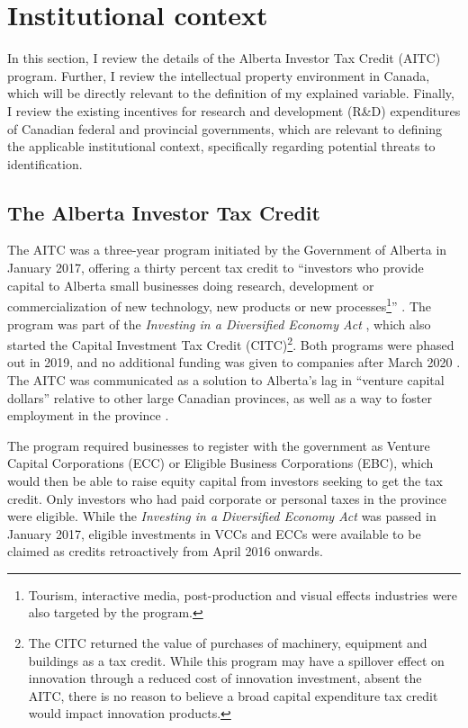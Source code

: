 \documentclass[../main.tex]{subfiles}
\begin{document}
\section{Institutional context}
\label{sec:institutional_background}

In this section, I review the details of the Alberta Investor Tax Credit (AITC) program. Further, I review the intellectual property environment in Canada, which will be directly relevant to the definition of my explained variable. Finally, I review the existing incentives for research and development (R\&D) expenditures of Canadian federal and provincial governments, which are relevant to defining the applicable institutional context, specifically regarding potential threats to identification.

\subsection{The Alberta Investor Tax Credit}

The AITC was a three-year program initiated by the Government of Alberta in January 2017, offering a thirty percent tax credit to \enquote{investors who provide capital to Alberta small businesses doing research, development or commercialization of new technology, new products or new processes\footnote{Tourism, interactive media, post-production and visual effects industries were also targeted by the program.}} \parencite[p.1]{albertaeconomicdevelopmentandtrade17}. The program was part of the \textit{Investing in a Diversified Economy Act} \nocite{Investing16}, which also started the Capital Investment Tax Credit (CITC)\footnote{The CITC returned the value of purchases of machinery, equipment and buildings as a tax credit. While this program may have a spillover effect on innovation through a reduced cost of innovation investment, absent the AITC, there is no reason to believe a broad capital expenditure tax credit would impact innovation products.}. Both programs were phased out in 2019, and no additional funding was given to companies after March 2020 \parencite{albertaeconomicdevelopmentandtrade19}. The AITC was communicated as a solution to Alberta's lag in \enquote{venture capital dollars} \parencite[p.1]{albertaeconomicdevelopmentandtrade17} relative to other large Canadian provinces, as well as a way to foster employment in the province \parencite{zabjeck16}.

The program required businesses to register with the government as Venture Capital Corporations (ECC) or Eligible Business Corporations (EBC), which would then be able to raise equity capital from investors seeking to get the tax credit. Only investors who had paid corporate or personal taxes in the province were eligible. While the \textit{Investing in a Diversified Economy Act} was passed in January 2017, eligible investments in VCCs and ECCs were available to be claimed as credits retroactively from April 2016 onwards.
\end{document}
